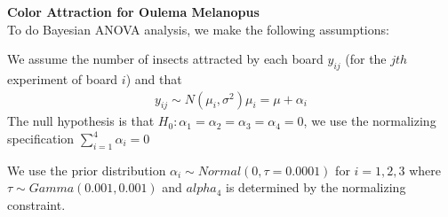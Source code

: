 \documentclass{homeworg}
\begin{document}
\exercise 
\textbf{Color Attraction for Oulema Melanopus} \\
To do Bayesian ANOVA analysis, we make the following assumptions: 

We assume the number of insects attracted by each board $y_{ij}$ (for the $jth$ experiment of board $i$) and that 
\begin{align*}
y_{ij} \sim N(\mu_i,\sigma^2)
\mu_i=\mu+\alpha_i
\end{align*}
The null hypothesis is that $H_0: \alpha_1=\alpha_2=\alpha_3=\alpha_4=0$, we use the normalizing specification $\sum_{i=1}^{4}\alpha_i=0$

We use the prior distribution $\alpha_i\sim Normal(0,\tau=0.0001)$ for $i=1,2,3$ where $\tau \sim Gamma(0.001,0.001)$ and $alpha_4$ is determined by the normalizing constraint. 
\end{document}
